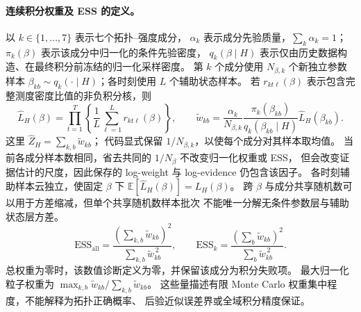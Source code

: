 \paragraph{连续积分权重及 ESS 的定义。}
以 $k\in\{1,\ldots,7\}$ 表示七个拓扑--强度成分，
$\alpha_k$ 表示成分先验质量，$\sum_k\alpha_k=1$；
$\pi_k(\beta)$ 表示该成分中归一化的条件先验密度，
$q_k(\beta\mid H)$ 表示仅由历史数据构造、在最终积分前冻结的归一化采样密度。
第 $k$ 个成分使用 $N_{\beta,k}$ 个新独立参数样本
$\beta_{kb}\sim q_k(\cdot\mid H)$；各时刻使用 $L$ 个辅助状态样本。
若 $r_{kt\ell}(\beta)$ 表示包含完整测度密度比值的非负积分核，则
\begin{equation}
 \widehat L_H(\beta)=\prod_{t=1}^{T}
 \left\{\frac1L\sum_{\ell=1}^{L}r_{kt\ell}(\beta)\right\},
 \qquad
 \widetilde w_{kb}=
 \frac{\alpha_k}{N_{\beta,k}}
 \frac{\pi_k(\beta_{kb})}{q_k(\beta_{kb}\mid H)}
 \widehat L_H(\beta_{kb}).
\end{equation}
这里 $\widehat Z_H=\sum_{k,b}\widetilde w_{kb}$；
代码显式保留 $1/N_{\beta,k}$，以使每个成分对其样本取均值。
当前各成分样本数相同，省去共同的 $1/N_{\beta}$ 不改变归一化权重或 ESS，
但会改变证据估计的尺度，因此保存的 log-weight 与 log-evidence 仍包含该因子。
各时刻辅助样本云独立，使固定 $\beta$ 下
$\mathbb E[\widehat L_H(\beta)]=L_H(\beta)$。
跨 $\beta$ 与成分共享随机数可以用于方差缩减，但单个共享随机数样本批次
不能唯一分解无条件参数层与辅助状态层方差。
\begin{equation}
 \mathrm{ESS}_{\mathrm{all}}=
 \frac{(\sum_{k,b}\widetilde w_{kb})^2}{\sum_{k,b}\widetilde w_{kb}^{\,2}},
 \qquad
 \mathrm{ESS}_{k}=
 \frac{(\sum_b\widetilde w_{kb})^2}{\sum_b\widetilde w_{kb}^{\,2}}.
\end{equation}
总权重为零时，该数值诊断定义为零，并保留该成分为积分失败项。
最大归一化粒子权重为
$\max_{k,b}\widetilde w_{kb}/\sum_{k,b}\widetilde w_{kb}$。
这些量描述有限 Monte Carlo 权重集中程度，不能解释为拓扑正确概率、
后验近似误差界或全域积分精度保证。
